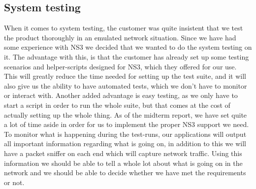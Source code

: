     \subsection{System testing}\label{System testing}
    When it comes to system testing, the customer was quite insistent that we test the product thoroughly in an emulated network situation. Since we have had some experience with NS3 we decided that we wanted to do the system testing on it. The advantage with this, is that the customer has already set up some testing scenarios and helper-scripts designed for NS3, which they offered for our use. This will greatly reduce the time needed for setting up the test suite, and it will also give us the ability to have automated tests, which we don’t have to monitor or interact with. Another added advantage is easy testing, as we only have to start a script in order to run the whole suite, but that comes at the cost of actually setting up the whole thing. As of the midterm report, we have set quite a lot of time aside in order for us to implement the proper NS3 support we need. To monitor what is happening during the test-runs, our applications will output all important information regarding what is going on, in addition to this we will have a \gls{packet sniffer} on each end which will capture network traffic. Using this information we should be able to tell a whole lot about what is going on in the network and we should be able to decide whether we have met the requirements or not.

